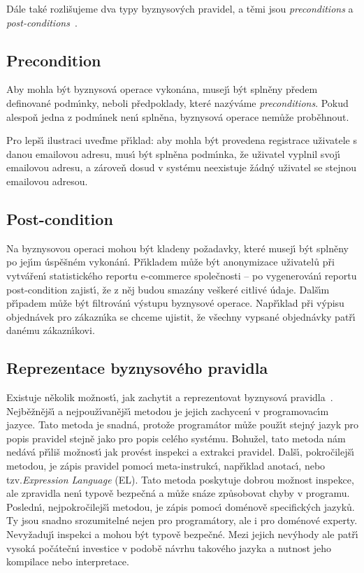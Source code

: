 Dále také rozlišujeme dva typy byznysov\'ych pravidel, a těmi jsou \textit{preconditions}
a \textit{post-conditions}~\cite{cemus2015automated}.

\subsection{Precondition}

Aby mohla b\'yt byznysová operace vykonána, musej\'{\i}
b\'yt splněny předem definované podm\'{\i}nky, neboli předpoklady,
které naz\'yváme \textit{preconditions}. Pokud alespoň jedna z podm\'{\i}nek
nen\'{\i} splněna, byznysová operace nemůže proběhnout.

Pro lepš\'{\i} ilustraci uveďme př\'{\i}klad: aby mohla b\'yt provedena
registrace uživatele s danou emailovou adresu, mus\'{\i} b\'yt splněna
podm\'{\i}nka, že uživatel vyplnil svoj\'{\i} emailovou adresu, a zároveň
dosud v systému neexistuje žádn\'y uživatel se stejnou emailovou adresou.

\subsection{Post-condition}

Na byznysovou operaci mohou b\'yt kladeny požadavky, které
musej\'{\i} b\'yt splněny po jej\'{\i}m úspěšném vykonán\'{\i}. Př\'{\i}kladem
může b\'yt anonymizace uživatelů při vytvářen\'{\i} statistického
reportu e-commerce společnosti – po vygenerován\'{\i} reportu
post-condition zajist\'{\i}, že z něj budou smazány veškeré citlivé údaje.
Dalš\'{\i}m př\'{\i}padem může b\'yt filtrován\'{\i} v\'ystupu byznysové operace.
Např\'{\i}klad při v\'ypisu objednávek pro zákazn\'{\i}ka se chceme ujistit, že
všechny vypsané objednávky patř\'{\i} danému zákazn\'{\i}kovi.

\subsection{Reprezentace byznysového pravidla}

Existuje několik možnost\'{\i}, jak zachytit a reprezentovat byznysová pravidla~\cite{cemus2015automated}.
Nejběžnějš\'{\i} a nejpouž\'{\i}vanějš\'{\i} metodou je jejich zachycen\'{\i} v programovac\'{\i}m
jazyce. Tato metoda je snadná, protože programátor může použ\'{\i}t stejn\'y jazyk
pro popis pravidel stejně jako pro popis celého systému. Bohužel, tato metoda
nám nedává př\'{\i}liš možnost\'{\i} jak provést inspekci a extrakci pravidel.
Dalš\'{\i}, pokročilejš\'{\i} metodou, je zápis pravidel pomoc\'{\i} meta-instrukc\'{\i}, např\'{\i}klad anotac\'{\i},
nebo tzv.\textit{Expression Language} (\gls{EL}). Tato metoda poskytuje dobrou možnost inspekce,
ale zpravidla nen\'{\i} typově bezpečná a může snáze způsobovat chyby v programu.
Posledn\'{\i}, nejpokročilejš\'{\i} metodou, je zápis pomoc\'{\i} doménově specifick\'ych jazyků.
Ty jsou snadno srozumitelné nejen pro programátory, ale i pro doménové experty.
Nevyžaduj\'{\i} inspekci a mohou b\'yt typově bezpečné. Mezi jejich nev\'yhody ale patř\'{\i} vysoká
počátečn\'{\i} investice v podobě návrhu takového jazyka a nutnost jeho kompilace nebo
interpretace.

